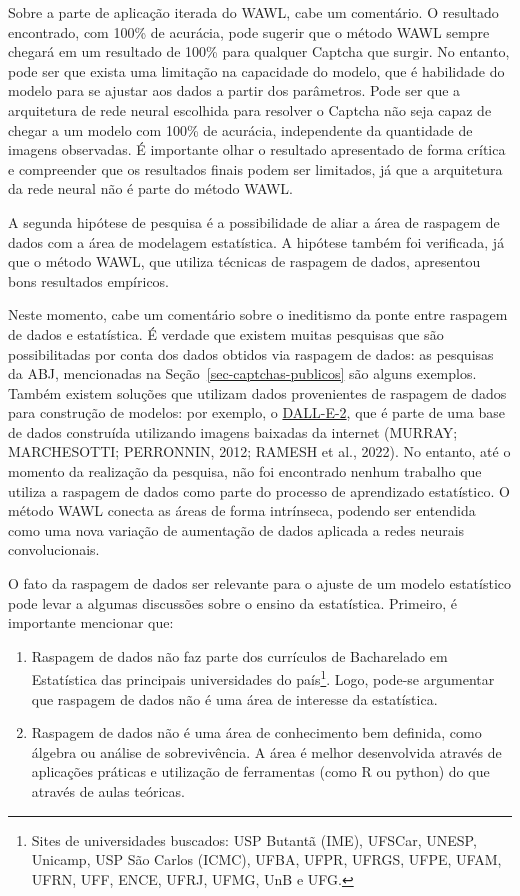 \documentclass[12pt,twoside,brazilian]{book}
\providecommand{\tightlist}{%
  \setlength{\itemsep}{0pt}\setlength{\parskip}{0pt}}
\begin{document}
Sobre a parte de aplicação iterada do WAWL, cabe um comentário. O
resultado encontrado, com 100\% de acurácia, pode sugerir que o método
WAWL sempre chegará em um resultado de 100\% para qualquer Captcha que
surgir. No entanto, pode ser que exista uma limitação na capacidade do
modelo, que é habilidade do modelo para se ajustar aos dados a partir
dos parâmetros. Pode ser que a arquitetura de rede neural escolhida para
resolver o Captcha não seja capaz de chegar a um modelo com 100\% de
acurácia, independente da quantidade de imagens observadas. É importante
olhar o resultado apresentado de forma crítica e compreender que os
resultados finais podem ser limitados, já que a arquitetura da rede
neural não é parte do método WAWL.

A segunda hipótese de pesquisa é a possibilidade de aliar a área de
raspagem de dados com a área de modelagem estatística. A hipótese também
foi verificada, já que o método WAWL, que utiliza técnicas de raspagem
de dados, apresentou bons resultados empíricos.

Neste momento, cabe um comentário sobre o ineditismo da ponte entre
raspagem de dados e estatística. É verdade que existem muitas pesquisas
que são possibilitadas por conta dos dados obtidos via raspagem de
dados: as pesquisas da ABJ, mencionadas na
Seção~\ref{sec-captchas-publicos} são alguns exemplos. Também existem
soluções que utilizam dados provenientes de raspagem de dados para
construção de modelos: por exemplo, o
\href{https://openai.com/dall-e-2/}{DALL-E-2}, que é parte de uma base
de dados construída utilizando imagens baixadas da internet (MURRAY;
MARCHESOTTI; PERRONNIN, 2012; RAMESH et al., 2022). No entanto, até o
momento da realização da pesquisa, não foi encontrado nenhum trabalho
que utiliza a raspagem de dados como parte do processo de aprendizado
estatístico. O método WAWL conecta as áreas de forma intrínseca, podendo
ser entendida como uma nova variação de aumentação de dados aplicada a
redes neurais convolucionais.

O fato da raspagem de dados ser relevante para o ajuste de um modelo
estatístico pode levar a algumas discussões sobre o ensino da
estatística. Primeiro, é importante mencionar que:

\begin{enumerate}
\def\labelenumi{\arabic{enumi}.}
\tightlist
\item
  Raspagem de dados não faz parte dos currículos de Bacharelado em
  Estatística das principais universidades do país\footnote{Sites de
    universidades buscados: USP Butantã (IME), UFSCar, UNESP, Unicamp,
    USP São Carlos (ICMC), UFBA, UFPR, UFRGS, UFPE, UFAM, UFRN, UFF,
    ENCE, UFRJ, UFMG, UnB e UFG.}. Logo, pode-se argumentar que raspagem
  de dados não é uma área de interesse da estatística.
\item
  Raspagem de dados não é uma área de conhecimento bem definida, como
  álgebra ou análise de sobrevivência. A área é melhor desenvolvida
  através de aplicações práticas e utilização de ferramentas (como R ou
  python) do que através de aulas teóricas.
\end{enumerate}
\end{document}
